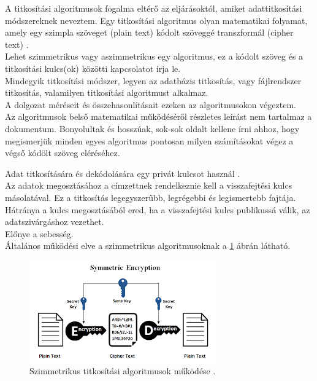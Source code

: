 
A titkosítási algoritmusok fogalma eltérő az eljárásoktól, amiket adattitkosítási módszereknek neveztem. Egy titkosítási algoritmus olyan matematikai folyamat, amely egy szimpla szöveget (plain text) kódolt szöveggé transzformál (cipher text) \cite{thakkar2022blog}.
\\ Lehet szimmetrikus vagy aszimmetrikus egy algoritmus, ez a kódolt szöveg és a titkosítási kulcs(ok) közötti kapcsolatot írja le.
\vspace{5pt}\\Mindegyik titkosítási módszer, legyen az adatbázis titkosítás, vagy fájlrendszer titkosítás, valamilyen titkosítási algoritmust alkalmaz.
\\A dolgozat méréseit és összehasonlításait ezeken az algoritmusokon végeztem.
\vspace{5pt}\\Az algoritmusok belső matematikai működéséről részletes leírást nem tartalmaz a dokumentum. Bonyolultak és hosszúak, sok-sok oldalt kellene írni ahhoz, hogy megismerjük minden egyes algoritmus pontosan milyen számításokat végez a végső kódölt szöveg eléréséhez.
 
\noindent Adat titkosítására és dekódolására egy privát kulcsot használ \cite{abd2010evaluating}.
\\Az adatok megosztásához a címzettnek rendelkeznie kell a visszafejtési kulcs másolatával. Ez a titkosítás legegyszerűbb, legrégebbi és legismertebb fajtája.
\\Hátránya a kulcs megosztásából ered, ha a visszafejtési kulcs publikussá válik, az adatszivárgáshoz vezethet.
\\Előnye a sebesség. \newline
\\Általános működési elve a szimmetrikus algoritmusoknak a \ref{fig:sym_encryption} ábrán látható.
\begin{figure}[H]
	\centering
	\includegraphics[scale=0.6]{images/sym.png}
	\caption{Szimmetrikus titkosítási algoritmusok működése \cite{ssl2buywiki}.}
	\label{fig:sym_encryption}
\end{figure}

